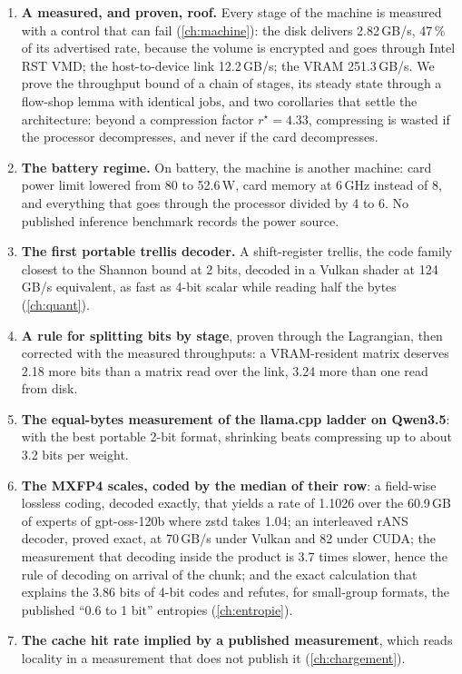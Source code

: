 \begin{enumerate}
\item \textbf{A measured, and proven, roof.} Every stage of the machine is measured with a control that can fail (\cref{ch:machine}): the disk delivers 2.82\,GB/s, 47\,\% of its advertised rate, because the volume is encrypted and goes through Intel RST VMD; the host-to-device link 12.2\,GB/s; the VRAM 251.3\,GB/s. We prove the throughput bound of a chain of stages, its steady state through a flow-shop lemma with identical jobs, and two corollaries that settle the architecture: beyond a compression factor $r^\star = 4.33$, compressing is wasted if the processor decompresses, and never if the card decompresses.
\item \textbf{The battery regime.} On battery, the machine is another machine: card power limit lowered from 80 to 52.6\,W, card memory at 6\,GHz instead of 8, and everything that goes through the processor divided by 4 to 6. No published inference benchmark records the power source.
\item \textbf{The first portable trellis decoder.} A shift-register trellis, the code family closest to the Shannon bound at 2 bits, decoded in a Vulkan shader at 124\,GB/s equivalent, as fast as 4-bit scalar while reading half the bytes (\cref{ch:quant}).
\item \textbf{A rule for splitting bits by stage}, proven through the Lagrangian, then corrected with the measured throughputs: a VRAM-resident matrix deserves 2.18 more bits than a matrix read over the link, 3.24 more than one read from disk.
\item \textbf{The equal-bytes measurement of the llama.cpp ladder on Qwen3.5}: with the best portable 2-bit format, shrinking beats compressing up to about 3.2 bits per weight.
\item \textbf{The MXFP4 scales, coded by the median of their row}: a field-wise lossless coding, decoded exactly, that yields a rate of 1.1026 over the 60.9\,GB of experts of gpt-oss-120b where zstd takes 1.04; an interleaved rANS decoder, proved exact, at 70\,GB/s under Vulkan and 82 under CUDA; the measurement that decoding inside the product is 3.7 times slower, hence the rule of decoding on arrival of the chunk; and the exact calculation that explains the 3.86 bits of 4-bit codes and refutes, for small-group formats, the published ``0.6 to 1 bit'' entropies (\cref{ch:entropie}).
\item \textbf{The cache hit rate implied by a published measurement}, which reads locality in a measurement that does not publish it (\cref{ch:chargement}).

\end{enumerate}
